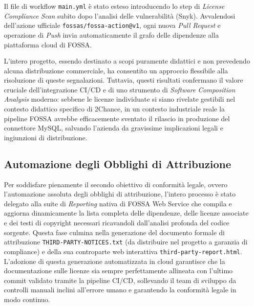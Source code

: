 Il file di workflow \texttt{main.yml} è stato esteso introducendo lo step di \textit{License Compliance Scan} subito dopo l'analisi delle vulnerabilità (Snyk). Avvalendosi dell'azione ufficiale \texttt{fossas/fossa-action@v1}, ogni nuova \textit{Pull Request} e operazione di \textit{Push} invia automaticamente il grafo delle dipendenze alla piattaforma cloud di FOSSA.

L'intero progetto, essendo destinato a scopi puramente didattici e non prevedendo alcuna distribuzione commerciale, ha consentito un approccio flessibile alla risoluzione di queste segnalazioni. Tuttavia, questi risultati confermano il valore cruciale dell'integrazione CI/CD e di uno strumento di \textit{Software Composition Analysis} moderno: sebbene le licenze individuate si siano rivelate gestibili nel contesto didattico specifico di 2Chance, in un contesto industriale reale la pipeline FOSSA avrebbe efficacemente sventato il rilascio in produzione del connettore MySQL, salvando l'azienda da gravissime implicazioni legali e ingiunzioni di distribuzione.

\subsection{Automazione degli Obblighi di Attribuzione}

Per soddisfare pienamente il secondo obiettivo di conformità legale, ovvero l'automazione assoluta degli obblighi di attribuzione, l'intero processo è stato delegato alla suite di \textit{Reporting} nativa di FOSSA Web Service che compila e aggiorna dinamicamente la lista completa delle dipendenze, delle licenze associate e dei testi di copyright necessari ricavandoli dall'analisi profonda del codice sorgente. Questa fase culmina nella generazione del documento formale di attribuzione \texttt{THIRD-PARTY-NOTICES.txt} (da distribuire nel progetto a garanzia di compliance) e della sua controparte web interattiva \texttt{third-party-report.html}. L'adozione di questa generazione automatizzata in cloud garantisce che la documentazione sulle licenze sia sempre perfettamente allineata con l'ultimo commit validato tramite la pipeline CI/CD, sollevando il team di sviluppo da controlli manuali inclini all'errore umano e garantendo la conformità legale in modo continuo.